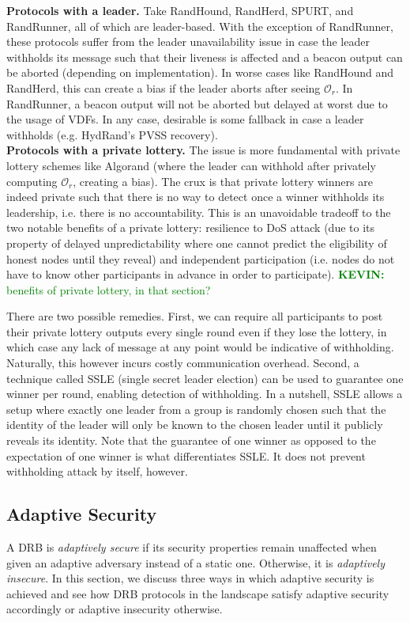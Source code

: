 \documentclass[letterpaper,twocolumn,10pt]{article}
\theoremstyle{definition}
\theoremstyle{remark}
\newcommand{\kevinnote}[1]{\textcolor{green}{\textbf{KEVIN:} #1}}
\begin{document}
\noindent\textbf{Protocols with a leader.} Take RandHound, RandHerd, SPURT, and RandRunner, all of which are leader-based. With the exception of RandRunner, these protocols suffer from the leader unavailability issue in case the leader withholds its message such that their liveness is affected and a beacon output can be aborted (depending on implementation). In worse cases like RandHound and RandHerd, this can create a bias if the leader aborts after seeing $\mathcal{O}_r$. In RandRunner, a beacon output will not be aborted but delayed at worst due to the usage of VDFs. In any case, desirable is some fallback in case a leader withholds (e.g. HydRand's PVSS recovery).\\

\noindent\textbf{Protocols with a private lottery.} The issue is more fundamental with private lottery schemes like Algorand (where the leader can withhold after privately computing $\mathcal{O}_r$, creating a bias). The crux is that private lottery winners are indeed private such that there is no way to detect once a winner withholds its leadership, i.e. there is no accountability. This is an unavoidable tradeoff to the two notable benefits of a private lottery: resilience to DoS attack (due to its property of delayed unpredictability \cite{azouvi2018winning} where one cannot predict the eligibility of honest nodes until they reveal) and independent participation (i.e. nodes do not have to know other participants in advance in order to participate). \kevinnote{benefits of private lottery, in that section?}

There are two possible remedies. First, we can require all participants to post their private lottery outputs every single round even if they lose the lottery, in which case any lack of message at any point would be indicative of withholding. Naturally, this however incurs costly communication overhead. Second, a technique called SSLE (single secret leader election) \cite{boneh2020single} can be used to guarantee one winner per round, enabling detection of withholding. In a nutshell, SSLE allows a setup where exactly one leader from a group is randomly chosen such that the identity of the leader will only be known to the chosen leader until it publicly reveals its identity. Note that the guarantee of one winner as opposed to the expectation of one winner is what differentiates SSLE. It does not prevent withholding attack by itself, however.

\subsection{Adaptive Security}
\label{subsection:adaptive}
A DRB is \textit{adaptively secure} if its security properties remain unaffected when given an adaptive adversary instead of a static one. Otherwise, it is \textit{adaptively insecure}. In this section, we discuss three ways in which adaptive security is achieved and see how DRB protocols in the landscape satisfy adaptive security accordingly or adaptive insecurity otherwise.
\end{document}
